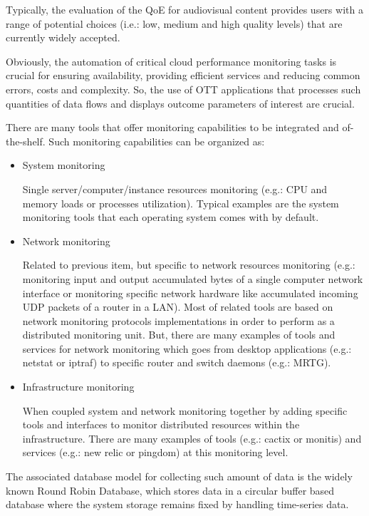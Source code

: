 Typically, the evaluation of the QoE for audiovisual content provides users with a range of potential choices (i.e.: low, medium and high quality levels) that are currently widely accepted.

Obviously, the automation of critical cloud performance monitoring tasks is crucial for ensuring availability, providing efficient services and reducing common errors, costs and complexity. So, the use of OTT applications that processes such quantities of data flows and displays outcome parameters of interest are crucial. 

There are many tools that offer monitoring capabilities to be integrated and of-the-shelf. Such monitoring capabilities can be organized as:

\begin{itemize}
\item System monitoring \hfill

Single server/computer/instance resources monitoring (e.g.: CPU and memory loads or processes utilization). Typical examples are the system monitoring tools that each operating system comes with by default.
\item Network monitoring \hfill

Related to previous item, but specific to network resources monitoring (e.g.: monitoring input and output accumulated bytes of a single computer network interface or monitoring specific network hardware like accumulated incoming UDP packets of a router in a LAN). Most of related tools are based on network monitoring protocols implementations in order to perform as a distributed monitoring unit. But, there are many examples of tools and services for network monitoring which goes from desktop applications (e.g.: netstat or iptraf) to specific router and switch daemons (e.g.: MRTG).
\item Infrastructure monitoring \hfill

When coupled system and network monitoring together by adding specific tools and interfaces to monitor distributed resources within the infrastructure. There are many examples of tools  (e.g.: cactix or monitis) and services (e.g.: new relic or pingdom) at this monitoring level.
\end{itemize}

The associated database model for collecting such amount of data is the widely known Round Robin Database, which stores data in a circular buffer based database where the system storage remains fixed by handling time-series data. 

